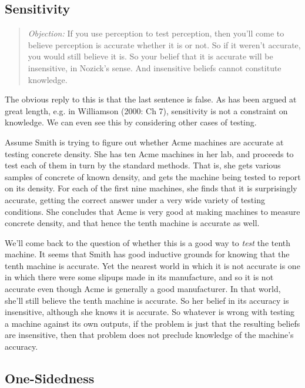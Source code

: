 \subsection{Sensitivity}

\begin{quote}\textit{Objection:}
If you use perception to test perception, then you'll come to believe perception is accurate whether it is or not. So if it weren't accurate, you would still believe it is. So your belief that it is accurate will be insensitive, in Nozick's sense. And insensitive beliefs cannot constitute knowledge.
\end{quote}

\noindent The obvious reply to this is that the last sentence is false. As has been argued at great length, e.g. in Williamson (2000: Ch 7), sensitivity is not a constraint on knowledge. We can even see this by considering other cases of testing. 

Assume Smith is trying to figure out whether Acme machines are accurate at testing concrete density. She has ten Acme machines in her lab, and proceeds to test each of them in turn by the standard methods. That is, she gets various samples of concrete of known density, and gets the machine being tested to report on its density. For each of the first nine machines, she finds that it is surprisingly accurate, getting the correct answer under a very wide variety of testing conditions. She concludes that Acme is very good at making machines to measure concrete density, and that hence the tenth machine is accurate as well.

We'll come back to the question of whether this is a good way to \textit{test} the tenth machine. It seems that Smith has good inductive grounds for knowing that the tenth machine is accurate. Yet the nearest world in which it is not accurate is one in which there were some slipups made in its manufacture, and so it is not accurate even though Acme is generally a good manufacturer. In that world, she'll still believe the tenth machine is accurate. So her belief in its accuracy is insensitive, although she knows it is accurate. So whatever is wrong with testing a machine against its own outputs, if the problem is just that the resulting beliefs are insensitive, then that problem does not preclude knowledge of the machine's accuracy.

\subsection{One-Sidedness}

